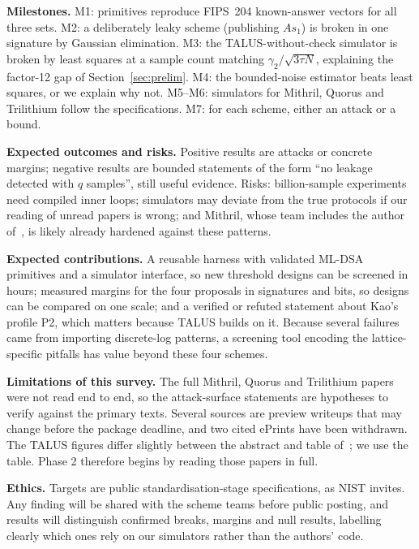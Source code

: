 \documentclass[10pt,conference,a4paper]{IEEEtran}
\begin{document}
\textbf{Milestones.} M1: primitives reproduce FIPS~204 known-answer vectors for all three sets. M2: a deliberately leaky
scheme (publishing $As_1$) is broken in one signature by Gaussian elimination. M3: the TALUS-without-check simulator is
broken by least squares at a sample count matching $\gamma_2/\sqrt{3\tau N}$, explaining the factor-12 gap of
Section~\ref{sec:prelim}. M4: the bounded-noise estimator beats least squares, or we explain why not. M5--M6: simulators for
Mithril, Quorus and Trilithium follow the specifications. M7: for each scheme, either an attack or a bound.

\textbf{Expected outcomes and risks.} Positive results are attacks or concrete margins; negative results are bounded
statements of the form ``no leakage detected with $q$ samples'', still useful evidence. Risks: billion-sample experiments
need compiled inner loops; simulators may deviate from the true protocols if our reading of unread papers is wrong; and
Mithril, whose team includes the author of~\cite{niot}, is likely already hardened against these patterns.

\textbf{Expected contributions.} A reusable harness with validated ML-DSA primitives and a simulator interface, so new
threshold designs can be screened in hours; measured margins for the four proposals in signatures and bits, so designs
can be compared on one scale; and a verified or refuted statement about Kao's profile P2, which matters because TALUS
builds on it. Because several failures came from importing discrete-log patterns, a screening tool encoding the
lattice-specific pitfalls has value beyond these four schemes.

\textbf{Limitations of this survey.} The full Mithril, Quorus and Trilithium papers were not read end to end, so the
attack-surface statements are hypotheses to verify against the primary texts. Several sources are preview writeups that
may change before the package deadline, and two cited ePrints have been withdrawn. The TALUS figures differ slightly
between the abstract and table of~\cite{niot}; we use the table. Phase 2 therefore begins by reading those papers in full.

\textbf{Ethics.} Targets are public standardisation-stage specifications, as NIST invites. Any finding will be shared
with the scheme teams before public posting, and results will distinguish confirmed breaks, margins and null results,
labelling clearly which ones rely on our simulators rather than the authors' code.

\end{document}
